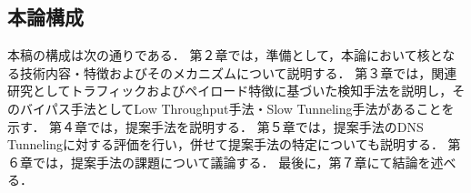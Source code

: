 \subsection{本論構成}
本稿の構成は次の通りである．
第２章では，準備として，本論において核となる技術内容・特徴およびそのメカニズムについて説明する．
第３章では，関連研究としてトラフィックおよびペイロード特徴に基づいた検知手法を説明し，そのバイパス手法としてLow Throughput手法・Slow Tunneling手法があることを示す．
第４章では，提案手法を説明する．
第５章では，提案手法のDNS Tunnelingに対する評価を行い，併せて提案手法の特定についても説明する．
第６章では，提案手法の課題について議論する．
最後に，第７章にて結論を述べる．
